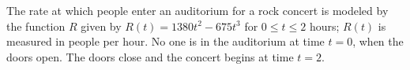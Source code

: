 
%
%
%
%
% 
% 

\question The rate at which people enter an auditorium for a rock concert is modeled by the function $R$ given by $R(t)=1380t^2-675t^3$ for $0 \leq t \leq 2$ hours; $R(t)$ is measured in people per hour. No one is in the auditorium at time $t=0$, when the doors open. The doors close and the concert begins at time $t=2$. 

\ifprintanswers
\fi 

\begin{solution}
\end{solution}

